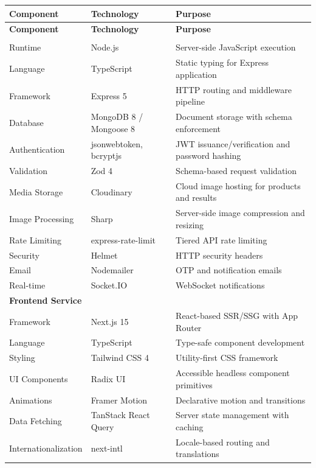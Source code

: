 \begin{longtable}{p{3.5cm} p{3cm} p{7cm}}
\toprule
\textbf{Component} & \textbf{Technology} & \textbf{Purpose} \\
\midrule
\endfirsthead
\toprule
\textbf{Component} & \textbf{Technology} & \textbf{Purpose} \\
\midrule
\endhead
\bottomrule
\endfoot

\multicolumn{3}{l}{\textbf{Backend Service}} \\
\midrule
Runtime & Node.js & Server-side JavaScript execution \\
Language & TypeScript & Static typing for Express application \\
Framework & Express 5 & HTTP routing and middleware pipeline \\
Database & MongoDB 8 / Mongoose 8 & Document storage with schema enforcement \\
Authentication & jsonwebtoken, bcryptjs & JWT issuance/verification and password hashing \\
Validation & Zod 4 & Schema-based request validation \\
Media Storage & Cloudinary & Cloud image hosting for products and results \\
Image Processing & Sharp & Server-side image compression and resizing \\
Rate Limiting & express-rate-limit & Tiered API rate limiting \\
Security & Helmet & HTTP security headers \\
Email & Nodemailer & OTP and notification emails \\
Real-time & Socket.IO & WebSocket notifications \\
\midrule
\multicolumn{3}{l}{\textbf{Frontend Service}} \\
\midrule
Framework & Next.js 15 & React-based SSR/SSG with App Router \\
Language & TypeScript & Type-safe component development \\
Styling & Tailwind CSS 4 & Utility-first CSS framework \\
UI Components & Radix UI & Accessible headless component primitives \\
Animations & Framer Motion & Declarative motion and transitions \\
Data Fetching & TanStack React Query & Server state management with caching \\
Internationalization & next-intl & Locale-based routing and translations \\

\end{longtable}

